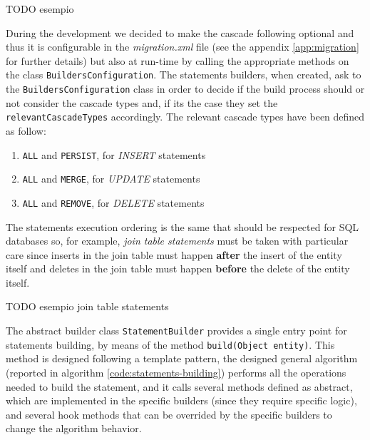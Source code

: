 \newparagraph TODO esempio

\newparagraph During the development we decided to make the cascade following optional and thus it is configurable in the \textit{migration.xml} file (see the appendix \ref{app:migration} for further details) but also at run-time by calling the appropriate methods on the class \texttt{BuildersConfiguration}. The statements builders, when created, ask to the \texttt{BuildersConfiguration} class in order to decide if the build process should or not consider the cascade types and, if its the case they set the \texttt{relevantCascadeTypes} accordingly.
The relevant cascade types have been defined as follow:
\begin{enumerate}
\item \texttt{ALL} and \texttt{PERSIST}, for \textit{INSERT} statements
\item \texttt{ALL} and \texttt{MERGE}, for \textit{UPDATE} statements
\item \texttt{ALL} and \texttt{REMOVE}, for \textit{DELETE} statements
\end{enumerate}
\noindent The statements execution ordering is the same that should be respected for SQL databases so, for example, \textit{join table statements} must be taken with particular care since inserts in the join table must happen \textbf{after} the insert of the entity itself and deletes in the join table must happen \textbf{before} the delete of the entity itself.

\newparagraph TODO esempio join table statements

\newparagraph The abstract builder class \texttt{StatementBuilder} provides a single entry point for statements building, by means of the method \texttt{build(Object entity)}. This method is designed following a template pattern, the designed general algorithm (reported in algorithm \ref{code:statements-building}) performs all the operations needed to build the statement, and it calls several methods defined as abstract, which are implemented in the specific builders (since they require specific logic), and several hook methods that can be overrided by the specific builders to change the algorithm behavior.

